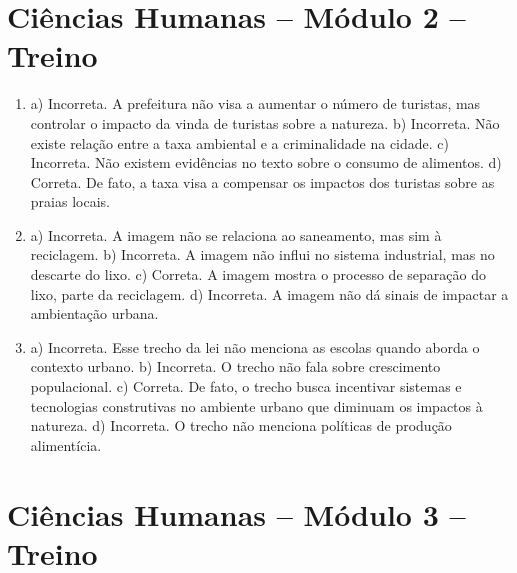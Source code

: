 \section*{Ciências Humanas – Módulo 2 – Treino}

\begin{enumerate}
\item
a) Incorreta. A prefeitura não visa a aumentar o número de turistas, mas
controlar o impacto da vinda de turistas sobre a natureza.
b) Incorreta. Não existe relação entre a taxa ambiental e a
criminalidade na cidade.
c) Incorreta. Não existem evidências no texto sobre o consumo de
alimentos.
d) Correta. De fato, a taxa visa a compensar os impactos dos turistas
sobre as praias locais.

\item
a) Incorreta. A imagem não se relaciona ao saneamento, mas sim à
reciclagem.
b) Incorreta. A imagem não influi no sistema industrial, mas no descarte
do lixo.
c) Correta. A imagem mostra o processo de separação do lixo, parte da
reciclagem.
d) Incorreta. A imagem não dá sinais de impactar a ambientação urbana.

\item
a) Incorreta. Esse trecho da lei não menciona as escolas quando aborda o
contexto urbano.
b) Incorreta. O trecho não fala sobre crescimento populacional.
c) Correta. De fato, o trecho busca incentivar sistemas e tecnologias
construtivas no ambiente urbano que diminuam os impactos à natureza.
d) Incorreta. O trecho não menciona políticas de produção alimentícia.
\end{enumerate}

\section*{Ciências Humanas – Módulo 3 – Treino}

